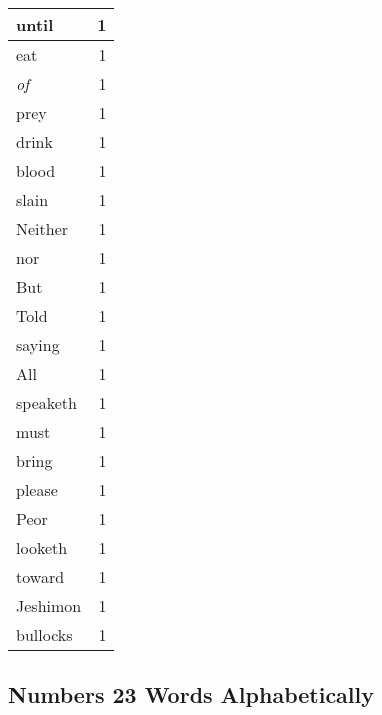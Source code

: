 \begin{center}
\begin{longtable}{l|r}
until & 1\\ \hline 
eat & 1\\ \hline 
\emph{of} & 1\\ \hline 
prey & 1\\ \hline 
drink & 1\\ \hline 
blood & 1\\ \hline 
slain & 1\\ \hline 
Neither & 1\\ \hline 
nor & 1\\ \hline 
But & 1\\ \hline 
Told & 1\\ \hline 
saying & 1\\ \hline 
All & 1\\ \hline 
speaketh & 1\\ \hline 
must & 1\\ \hline 
bring & 1\\ \hline 
please & 1\\ \hline 
Peor & 1\\ \hline 
looketh & 1\\ \hline 
toward & 1\\ \hline 
Jeshimon & 1\\ \hline 
bullocks & 1\\ \hline 
\end{longtable}
\end{center}





\subsection{Numbers 23 Words Alphabetically}


\normalsize
 
